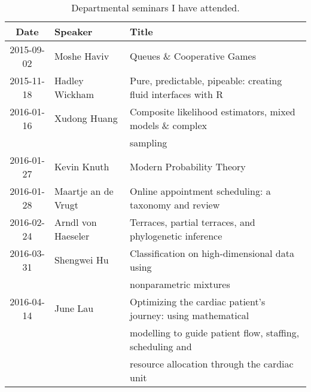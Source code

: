 \documentclass[12pt,a4paper]{article}
\begin{document}
\begin{table}[hh]
\caption{
Departmental seminars I have attended.%
}
\centering
\ ~~~~ \\
\label{tab:seminars}
\begin{tabular}{cll}
\toprule
Date & Speaker & Title \\
\midrule
2015-09-02 & Moshe Haviv &
Queues \& Cooperative Games \\
%
2015-11-18 & Hadley Wickham &
Pure, predictable, pipeable: creating fluid interfaces with R \\
%
2016-01-16 & Xudong Huang &
Composite likelihood estimators, mixed models \& complex \\
&&sampling \\
%
2016-01-27 & Kevin Knuth &
Modern Probability Theory \\
%
2016-01-28 & Maartje an de Vrugt &
Online appointment scheduling: a taxonomy and review \\
%
2016-02-24 & Arndl von Haeseler &
Terraces, partial terraces, and phylogenetic inference \\
%
2016-03-31 & Shengwei Hu &
Classification on high-dimensional data using\\&&nonparametric mixtures \\
%
2016-04-14 & June Lau &
Optimizing the cardiac patient's journey: using mathematical \\
&&modelling to guide patient flow, staffing, scheduling and \\
&&resource allocation through the cardiac unit \\
%
%
\bottomrule
\end{tabular}
\end{table}




\end{document}
